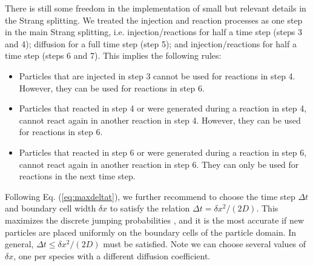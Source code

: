 \documentclass[10pt,twocolumn]{revtex4-1}
\begin{document}
	There is still some freedom in the implementation of small but relevant details in the Strang splitting. We treated the injection and reaction processes as one step in the main Strang splitting, i.e. injection/reactions for half a time step (steps 3 and 4); diffusion for a full time step (step 5); and injection/reactions for half a time step (steps 6 and 7). This implies the following rules:
	
	\begin{itemize}
		\item Particles that are injected in step 3 cannot be used for reactions in step 4. However, they can be used for reactions in step 6.  
		\item Particles that reacted in step 4 or were generated during a reaction in step 4, cannot react again in another reaction in step 4. However, they can be used for reactions in step 6.  
		\item Particles that reacted in step 6 or were generated during a reaction in step 6, cannot react again in another reaction in step 6. They can only be used for reactions in the next time step.
	\end{itemize}

   Following Eq. (\ref{eq:maxdeltat}), we further recommend to choose the time step $\Delta t$ and boundary cell width $\delta x$ to satisfy the relation $\Delta t = \delta x^2/(2D)$. This maximizes the discrete jumping probabilities \cite{del2016discrete,del2018grand}, and it is the most accurate if new particles are placed uniformly on the boundary cells of the particle domain. In general, $\Delta t \leq \delta x^2/(2D)$ must be satisfied. Note we can choose several values of $\delta x$, one per species with a different diffusion coefficient. 
	
\end{document}

